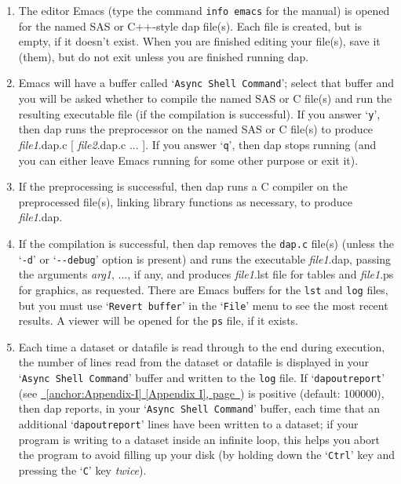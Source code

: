 \documentclass{book}
\newcommand\Texinfocommandstyletextvar[1]{{\normalfont{}\textsl{#1}}}%
\renewcommand{\_}{\Texinfounderscore\discretionary{}{}{}}
\begin{document}
\begin{enumerate}[start=1]
\item The editor Emacs (type the command \texttt{info emacs}
for the manual) is opened for the named SAS or C++-style dap file(s).
Each file is created, but is empty, if it doesn't exist.
When you are finished editing your file(s), save it (them), but do not
exit unless you are finished running dap.
\item Emacs will have a buffer called `\texttt{Async Shell Command}'; select that buffer
and you will be
asked whether to compile the named SAS or C file(s) and run the resulting
executable file (if the compilation is successful).
If you answer `\texttt{y}', then dap
runs the preprocessor on the named SAS or C file(s) to produce
\Texinfocommandstyletextvar{file1}.dap.c [ \Texinfocommandstyletextvar{file2}.dap.c ... ].
If you answer `\texttt{q}', then dap stops running (and you can either leave Emacs
running for some other purpose or exit it).

\item If the preprocessing is successful, 
then dap runs a C compiler on the preprocessed file(s), linking
library functions as necessary, to produce \Texinfocommandstyletextvar{file1}.dap.
\item If the compilation is successful, then dap removes the \texttt{dap.c} file(s)
(unless the `\texttt{-d}' or `\texttt{{-}{-}debug}' option is present) and
runs the executable \Texinfocommandstyletextvar{file1}.dap, passing the arguments
\Texinfocommandstyletextvar{arg1}, ..., if any, and produces \Texinfocommandstyletextvar{file1}.lst file for tables
%
%
and \Texinfocommandstyletextvar{file1}.ps for graphics, as requested.
%
%
There are Emacs buffers for
the \texttt{lst} and \texttt{log} files, but you must use
`\texttt{Revert buffer}'
%
in the `\texttt{File}' menu to see the most recent results.
A viewer will be opened for the \texttt{ps} file,
if it exists.

\item Each time a dataset or datafile is read through to the end
during execution, the number
of lines read from the dataset or datafile is displayed in your
`\texttt{Async Shell Command}' buffer and written to the \texttt{log} file.
If `\texttt{dap\_outreport}' (see \hyperref[anchor:Appendix-I]{\chaptername~\ref*{anchor:Appendix-I} [Appendix I], page~\pageref*{anchor:Appendix-I}}) is positive
(default: 100000), then dap reports, in your `\texttt{Async Shell Command}' buffer,
each time that an additional `\texttt{dap\_outreport}'
lines have been written to a dataset;
if your program is writing to a dataset inside an infinite loop,
this helps you abort the program to avoid filling up your disk
(by holding down the `\texttt{Ctrl}' key and pressing the `\texttt{C}' key \emph{twice}).
%


\end{enumerate}
\end{document}
